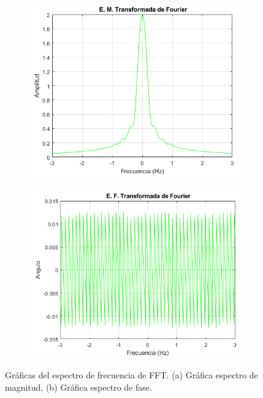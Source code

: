 \documentclass[11pt,letterpaper,twocolumn]{article}
\begin{document}
    \begin{figure}[h]
        \centering 
        \begin{subfigure}[h]{0.49\linewidth}
            \includegraphics[width=\linewidth]{img/EMagnitudTF_FFT.png}
            \label{magnitudFFT}
            \caption{}
        \end{subfigure}
        \begin{subfigure}[h]{0.49\linewidth}
            \includegraphics[width=\linewidth]{img/EFaseTF_FFT.png}
            \label{faseFFT}
            \caption{}
        \end{subfigure}
        \caption{Gráficas del espectro de frecuencia de FFT. (a) Gráfica 
                espectro de magnitud, (b) Gráfica espectro de fase.}
        \label{espectroFFT}
    \end{figure} 
    
\end{document}
